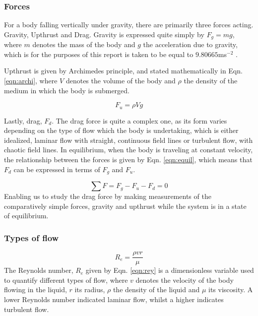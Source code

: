 \documentclass[11pt,a4paper]{article}
\begin{document}
    \subsubsection{Forces}
    For a body falling vertically under gravity, there are primarily three forces acting. Gravity, Upthrust and Drag. Gravity is expressed quite simply by $F_g = mg$, where $m$ denotes the mass of the body and $g$ the acceleration due to gravity, which is for the purposes of this report is taken to be equal to $9.80665$ms$^{-2}$ \cite{wiki:grav}. 

    Upthrust is given by Archimedes principle, and stated mathematically in Eqn. \ref{eqn:archi}, where $V$ denotes the volume of the body and $\rho$ the density of the medium in which the body is submerged.

    \begin{equation}
      F_u = \rho V g
      \label{eqn:archi}
    \end{equation}

    Lastly, drag, $F_d$. The drag force is quite a complex one, as its form varies depending on the type of flow which the body is undertaking, which is either idealized, laminar flow with straight, continuous field lines or turbulent flow, with chaotic field lines.
    In equilibrium, when the body is traveling at constant velocity, the relationship between the forces is given by Eqn. \ref{eqn:equil}, which means that $F_d$ can be expressed in terms of $F_g$ and $F_u$.
    
    \begin{equation}
      \sum F = F_g - F_u - F_d = 0
      \label{eqn:equil}
    \end{equation}
    Enabling us to study the drag force by making measurements of the comparatively simple forces, gravity and upthrust while the system is in a state of equilibrium.

    \subsubsection{\label{sec:fluflo}Types of flow}
    \begin{equation}
      R_e = \frac{\rho v r}{\mu}
      \label{eqn:rey}
    \end{equation}
    The Reynolds number, $R_e$ given by Eqn. \ref{eqn:rey} is a dimensionless variable used to quantify different types of flow, where $v$ denotes the velocity of the body flowing in the liquid, $r$ its radius, $\rho$ the density of the liquid and $\mu$ its viscosity. A lower Reynolds number indicated laminar flow, whilst a higher indicates turbulent flow.
\end{document}
